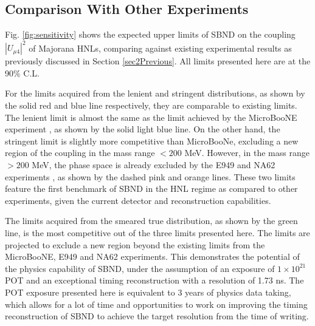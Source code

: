 \subsection{Comparison With Other Experiments}

Fig. \ref{fig:sensitivity} shows the expected upper limits of SBND on the coupling $|U_{\mu4}|^2$ of Majorana HNLs, comparing against existing experimental results as previously discussed in Section \ref{sec2Previous}.
All limits presented here are at the 90\% C.L.

For the limits acquired from the lenient and stringent distributions, as shown by the solid red and blue line respectively, they are comparable to existing limits.
The lenient limit is almost the same as the limit achieved by the MicroBooNE experiment \cite{uboone1, uboone2, uboone3}, as shown by the solid light blue line.
On the other hand, the stringent limit is slightly more competitive than MicroBooNe, excluding a new region of the coupling in the mass range $< 200$ MeV.
However, in the mass range $> 200$ MeV, the phase space is already excluded by the E949 \cite{E949} and NA62 experiments \cite{NA62A, NA62B}, as shown by the dashed pink and orange lines.
These two limits feature the first benchmark of SBND in the HNL regime as compared to other experiments, given the current detector and reconstruction capabilities.

The limits acquired from the smeared true distribution, as shown by the green line, is the most competitive out of the three limits presented here.
The limits are projected to exclude a new region beyond the existing limits from the MicroBooNE, E949 and NA62 experiments.
This demonstrates the potential of the physics capability of SBND, under the assumption of an exposure of $1 \times 10^{21}$ POT and an exceptional timing reconstruction with a resolution of 1.73 ns.
The POT exposure presented here is equivalent to 3 years of physics data taking, which allows for a lot of time and opportunities to work on improving the timing reconstruction of SBND to achieve the target resolution from the time of writing.

